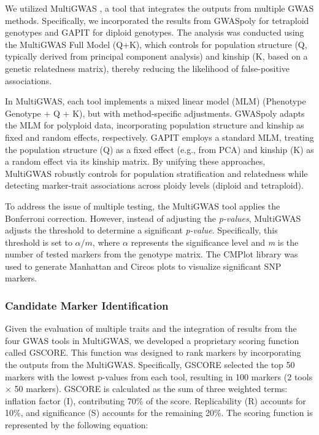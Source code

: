 \documentclass[pdflatex,sn-mathphys-ay]{sn-jnl}%
\begin{document}
We utilized MultiGWAS \citep{Garreta2021}, a tool that integrates the outputs from multiple GWAS methods. Specifically, we incorporated the results from GWASpoly \citep{Rosyara2016} for tetraploid genotypes and GAPIT \citep{Tan2016} for diploid genotypes. The analysis was conducted using the MultiGWAS Full Model (Q+K), which controls for population structure (Q, typically derived from principal component analysis) and kinship (K, based on a genetic relatedness matrix), thereby reducing the likelihood of false-positive associations.

In MultiGWAS, each tool implements a mixed linear model (MLM) (Phenotype ~ Genotype + Q + K), but with method-specific adjustments. GWASpoly adapts the MLM for polyploid data, incorporating population structure and kinship as fixed and random effects, respectively. GAPIT employs a standard MLM, treating the population structure (Q) as a fixed effect (e.g., from PCA) and kinship (K) as a random effect via its kinship matrix. By unifying these approaches, MultiGWAS robustly controls for population stratification and relatedness while detecting marker-trait associations across ploidy levels (diploid and tetraploid).




To address the issue of multiple testing, the MultiGWAS tool applies the Bonferroni correction. However, instead of adjusting the \textit{p-values}, MultiGWAS adjusts the threshold to determine a significant \textit{p-value}. Specifically, this threshold is set to $\alpha/m$, where $\alpha$ represents the significance level and \emph{m} is the number of tested markers from the genotype matrix. The CMPlot library \citep{CMPlot} was used to generate Manhattan and Circos plots to visualize significant SNP markers.


\subsubsection*{Candidate Marker Identification \label{score}}


Given the evaluation of multiple traits and the integration of results from the four GWAS tools in MultiGWAS, we developed a proprietary scoring function called GSCORE. This function was designed to rank markers by incorporating the outputs from the MultiGWAS. Specifically, GSCORE selected the top 50 markers with the lowest p-values from each tool, resulting in 100 markers (2 tools × 50 markers). GSCORE is calculated as the sum of three weighted terms: inflation factor (I), contributing 70\% of the score. Replicability (R) accounts for 10\%, and significance (S) accounts for the remaining 20\%. The scoring function is represented by the following equation:
\end{document}
